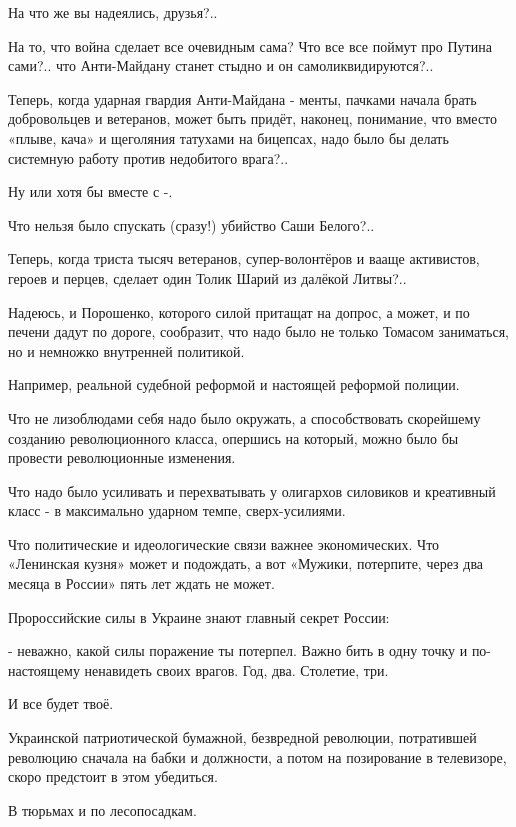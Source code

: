 На что же вы надеялись, друзья?..

На то, что война сделает все очевидным сама? Что все все поймут про Путина
сами?.. что Анти-Майдану станет стыдно и он самоликвидируются?..

Теперь, когда ударная гвардия Анти-Майдана - менты, пачками начала брать
добровольцев и ветеранов, может быть придёт, наконец, понимание, что вместо
«плыве, кача» и щеголяния татухами на бицепсах, надо было бы делать системную
работу против недобитого врага?..

Ну или хотя бы вместе с -.

Что нельзя было спускать (сразу!) убийство Саши Белого?..

Теперь, когда триста тысяч ветеранов, супер-волонтёров и вааще активистов,
героев и перцев, сделает один Толик Шарий из далёкой Литвы?..

Надеюсь, и Порошенко, которого силой притащат на допрос, а может, и по печени
дадут по дороге, сообразит, что надо было не только Томасом заниматься, но и
немножко внутренней политикой.

Например, реальной судебной реформой и настоящей реформой полиции.

Что не лизоблюдами себя надо было окружать, а способствовать скорейшему
созданию революционного класса, опершись на который, можно было бы провести
революционные изменения.

Что надо было усиливать и перехватывать у олигархов силовиков и креативный
класс - в максимально ударном темпе, сверх-усилиями. 

Что политические и идеологические связи важнее экономических. Что «Ленинская
кузня» может и подождать, а вот «Мужики, потерпите, через два месяца в России»
пять лет ждать не может. 

Пророссийские силы в Украине знают главный секрет России:

- неважно, какой силы поражение ты потерпел. Важно бить в одну точку и
по-настоящему ненавидеть своих врагов. Год, два. Столетие, три.

И все будет твоё.

Украинской патриотической бумажной, безвредной революции, потратившей революцию
сначала на бабки и должности, а потом на позирование в телевизоре, скоро
предстоит в этом убедиться.

В тюрьмах и по лесопосадкам.
